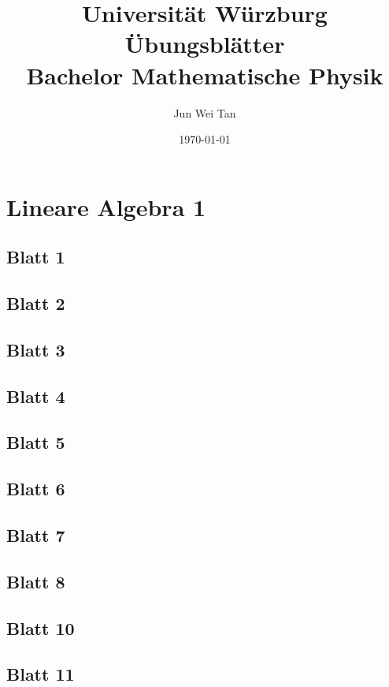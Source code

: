 \documentclass{tuftebook}
\numberwithin{Theorem}{chapter}
\theoremstyle{definition}
\theoremstyle{definition}
\begin{document}
	\title{Universit\"{a}t W\"{u}rzburg \"{U}bungsbl\"{a}tter\\Bachelor Mathematische Physik}
	\author{Jun Wei Tan}
	\date{\today}
	\maketitle
	\tableofcontents

\chapter{Lineare Algebra 1}
\section{Blatt 1}

\section{Blatt 2}

\section{Blatt 3}

\section{Blatt 4}

\section{Blatt 5}

\section{Blatt 6}

\section{Blatt 7}

\section{Blatt 8}

\section{Blatt 10}

\section{Blatt 11}

\end{document}
